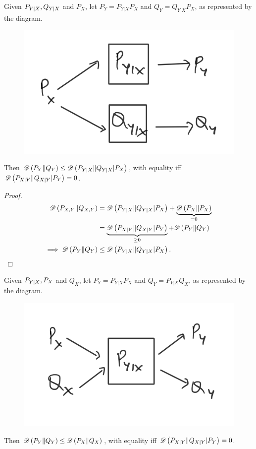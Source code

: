 \documentclass[11pt,a4paper]{article}
\begin{document}
\begin{theorem}
    Given $P_{Y|X}, Q_{Y|X}$ and $P_X$, let $P_Y = P_{Y|X} P_X$ and $Q_Y = Q_{Y|X}P_X$, as represented by the diagram. 
    \begin{figure}[ht]
        \centering
        \includegraphics[width=0.3\linewidth]{Conditional_Divergence.png}
        \label{fig:Conditional_Divergence}
    \end{figure}

    \noindent Then $\mathscr{D} \left(P_Y\|Q_Y\right)\le \mathscr{D} \left(P_{Y|X}\|Q_{Y|X} |P_X\right)$, with equality iff $\mathscr{D} \left(P_{X|Y}\|Q_{X|Y} |P_Y\right) = 0$.  
\end{theorem}

\begin{proof}
\begin{align*}
    \mathscr{D} \left(P_{X,Y}\|Q_{X,Y}\right)  &= \mathscr{D} \left(P_{Y|X}\|Q_{Y|X} |P_X\right) +  \underbrace{\mathscr{D} \left(P_X\|P_X\right)}_{ = 0} \\
        &= \underbrace{\mathscr{D} \left(P_{X|Y}\|Q_{X|Y} |P_Y\right)}_{\geq 0}  + \mathscr{D} \left(P_Y\|Q_Y\right)\\
    \implies \mathscr{D} \left(P_Y\|Q_Y\right) &\le \mathscr{D} \left(P_{Y|X}\|Q_{Y|X} |P_X\right).
\end{align*}
\end{proof}

\begin{theorem}
    Given $P_{Y|X}, P_X$ and $Q_X$, let $P_Y = P_{Y|X} P_X$ and $Q_Y = P_{Y|X}Q_X$, as represented by the diagram. 
    \begin{figure}[ht]
        \centering
        \includegraphics[width=0.3\linewidth]{DPI_Divergence.png}
        \label{fig:DPI_Divergence}
    \end{figure}

    \noindent Then $\mathscr{D} \left(P_Y\|Q_Y\right)\le \mathscr{D} \left(P_X\|Q_X\right)$, with equality iff $\mathscr{D} \left(P_{X|Y}\|Q_{X|Y} |P_Y\right) = 0$.
\end{theorem}
\end{document}
